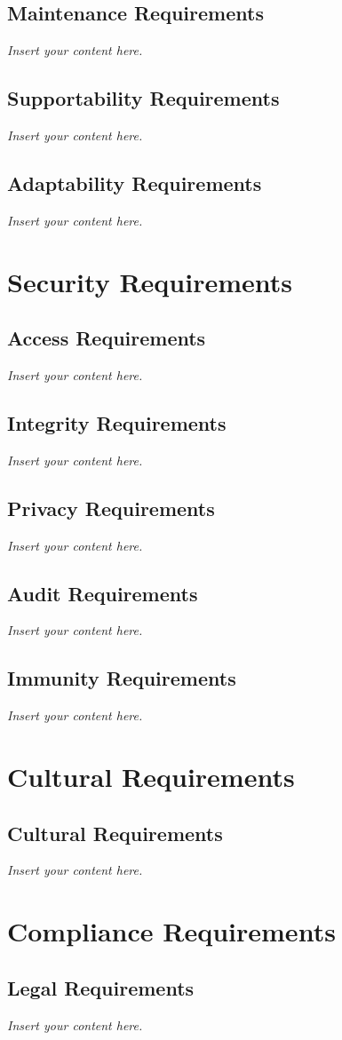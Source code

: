 \documentclass[12pt]{article}
\newcommand{\lips}{\textit{Insert your content here.}}
\begin{document}
\subsection{Maintenance Requirements}
\lips
\subsection{Supportability Requirements}
\lips
\subsection{Adaptability Requirements}
\lips

\section{Security Requirements}
\subsection{Access Requirements}
\lips
\subsection{Integrity Requirements}
\lips
\subsection{Privacy Requirements}
\lips
\subsection{Audit Requirements}
\lips
\subsection{Immunity Requirements}
\lips

\section{Cultural Requirements}
\subsection{Cultural Requirements}
\lips

\section{Compliance Requirements}
\subsection{Legal Requirements}
\lips
\end{document}
